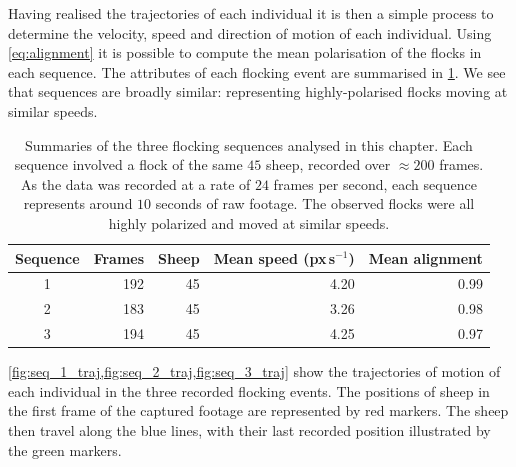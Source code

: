 Having realised the trajectories of each individual it is then a simple process
to determine the velocity, speed and direction of motion of each individual.
Using \cref{eq:alignment} it is possible to compute the mean polarisation of
the flocks in each sequence. The attributes of each flocking event are
summarised in \cref{tab:data_summary}. We see that sequences are broadly
similar: representing highly-polarised flocks moving at similar speeds.

\begin{table}[tbp]
\begin{tabular}{@{}crrrr@{}}
\toprule
Sequence & Frames & Sheep & Mean speed (px\,s$^{-1}$) & Mean alignment \\
\midrule
1 &    192 &     45 &      4.20 &          0.99 \\
2 &    183 &     45 &      3.26 &          0.98 \\
3 &    194 &     45 &      4.25 &          0.97 \\
\bottomrule
\end{tabular}
\caption{Summaries of the three flocking sequences analysed in this chapter.
  Each sequence involved a flock of the same $45$ sheep, recorded over
  $\approx200$ frames. As the data was recorded at a rate of $24$ frames per
  second, each sequence represents around $10$ seconds of raw footage. The
  observed flocks were all highly polarized and moved at similar speeds.}
\label{tab:data_summary}
\end{table}

\cref{fig:seq_1_traj,fig:seq_2_traj,fig:seq_3_traj} show the trajectories of
motion of each individual in the three recorded flocking events. The positions
of sheep in the first frame of the captured footage are represented by red
markers. The sheep then travel along the blue lines, with their last recorded
position illustrated by the green markers.

